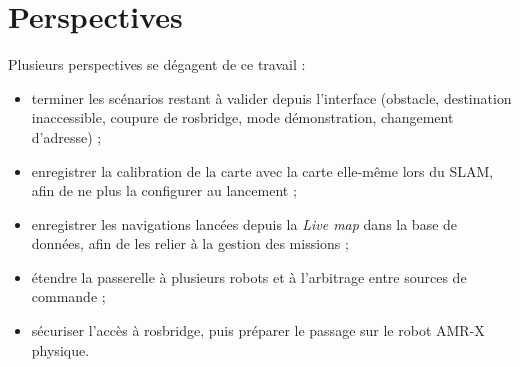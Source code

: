 \section*{Perspectives}
Plusieurs perspectives se dégagent de ce travail :
\begin{itemize}
  \item terminer les scénarios restant à valider depuis l'interface (obstacle,
    destination inaccessible, coupure de rosbridge, mode démonstration, changement
    d'adresse) ;
  \item enregistrer la calibration de la carte avec la carte elle-même lors du SLAM, afin
    de ne plus la configurer au lancement ;
  \item enregistrer les navigations lancées depuis la \emph{Live map} dans la base de
    données, afin de les relier à la gestion des missions ;
  \item étendre la passerelle à plusieurs robots et à l'arbitrage entre sources de
    commande ;
  \item sécuriser l'accès à rosbridge, puis préparer le passage sur le robot AMR-X
    physique.
\end{itemize}
